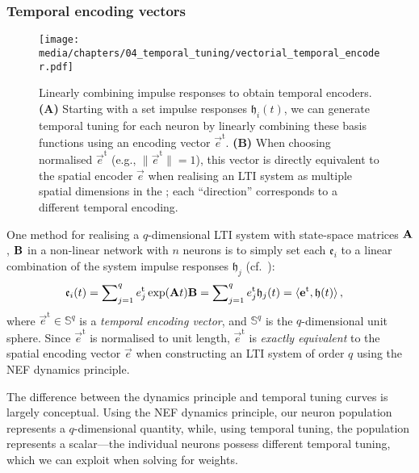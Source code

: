 \subsubsection{Temporal encoding vectors}

\begin{figure}
	\texttt{[image: media/chapters/04\_temporal\_tuning/vectorial\_temporal\_encoder.pdf]}
	\caption[Linearly combining impulse responses to obtain temporal encoders]{Linearly combining impulse responses to obtain temporal encoders. \textbf{(A)} Starting with a set impulse responses $\mathfrak{h}_i(t)$, we can generate temporal tuning for each neuron by linearly combining these basis functions using an encoding vector $\vec{e}^\mathrm{t}$.
	\textbf{(B)} When choosing normalised $\vec{e}^\mathrm{t}$ (e.g., $\| \vec{e}^\mathrm{t} \| = 1$), this vector is directly equivalent to the spatial encoder $\vec e$ when realising an LTI system as multiple spatial dimensions in the \NEF; each \enquote{direction} corresponds to a different temporal encoding.
	}
	\label{fig:vectorial_temporal_encoder}
\end{figure}

One method for realising a $q$-dimensional LTI system with state-space matrices $\mathbf{A}$, $\mathbf{B}$ in a non-linear network with $n$ neurons is to simply set each $\mathfrak{e}_i$ to a linear combination of the system impulse responses $\mathfrak{h}_j$ (cf.~):
\begin{align}
	\mathfrak{e}_i(t) &= \sum\nolimits_{j = 1}^q {e}^\mathrm{t}_j \exp(\mathbf{A} t) \mathbf{B} = \sum\nolimits_{j = 1}^q {e}^\mathrm{t}_j \mathfrak{h}_j(t)  = \langle \mathbf{e}^\mathrm{t}, \mathbf{\mathfrak{h}}(t) \rangle \,,
	\label{eqn:temporal_encoding_vector}
\end{align}
where $\vec{e}^\mathrm{t} \in \mathbb{S}^q$ is a \emph{temporal encoding vector}, and $\mathbb{S}^q$ is the $q$-dimensional unit sphere.
Since $\vec{e}^\mathrm{t}$ is normalised to unit length, $\vec{e}^\mathrm{t}$ is \emph{exactly equivalent} to the spatial encoding vector $\vec e$ when constructing an LTI system of order $q$ using the NEF dynamics principle.

The difference between the dynamics principle and temporal tuning curves is largely conceptual.
Using the NEF dynamics principle, our neuron population represents a $q$-dimensional quantity, while, using temporal tuning, the population represents a scalar---the individual neurons possess different temporal tuning, which we can exploit when solving for weights.

